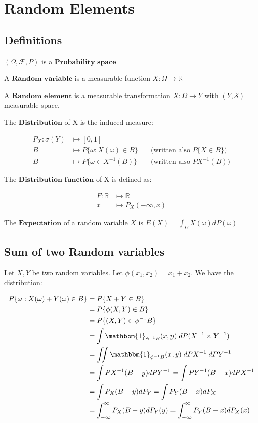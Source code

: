 
\section*{\LARGE Random Elements}

\subsection*{Definitions}

$(\Omega, \mathcal{F}, P)$ is a $\textbf{Probability space}$

\noindent A $\textbf{Random variable}$ is a measurable function $X : \Omega \rightarrow \mathbb{R}$

\noindent A $\textbf{Random element}$ is a measurable transformation $X : \Omega \rightarrow Y$ with $(Y, \mathcal{S})$ measurable space.

\noindent The $\textbf{Distribution}$ of X is the induced measure:

\begin{align*}
P_X : \sigma(Y) &\longmapsto [0,1] \\
    B &\longmapsto P\{\omega: X(\omega) \in B\} \quad &\text{(written also $P\{X \in B\}$)} \\
B &\longmapsto P\{\omega \in X^{-1}(B)\} &\text{(written also $PX^{-1}(B)$)}
\end{align*}

\noindent The $\textbf{Distribution function}$ of X is defined as: 

\begin{align*}
    F:\mathbb{R} &\longmapsto \mathbb{R} \\
x &\longmapsto P_X(-\infty, x)
\end{align*}

\noindent The $\textbf{Expectation}$ of a random variable $X$ is $E(X) = \displaystyle\int_{\Omega} X(\omega)dP(\omega)$


\subsection*{Sum of two Random variables}
Let $X,Y$ be two random variables. Let $\phi(x_1,x_2) = x_1 + x_2$. We have the distribution:

\begin{align*}
P\{\omega: X(\omega)+Y(\omega) \in B\} &= P\{X+Y \in B\} \\
&= P\{\phi(X,Y) \in B\} \\
&= P\{(X,Y) \in \phi^{-1}B\} \\
&= \int \mathbbm{1}_{\phi^{-1}B}(x,y)\;dP(X^{-1}\times Y^{-1}) \\
&= \iint \mathbbm{1}_{\phi^{-1}B}(x,y)\;dPX^{-1}\; dPY^{-1} \\
&= \int PX^{-1}(B-y) dPY^{-1} = \int PY^{-1}(B-x) dPX^{-1} \\
&= \int P_X(B-y) dP_Y = \int P_Y(B-x) dP_X \\
&= \int_{-\infty}^{\infty} P_X(B-y) dP_Y(y) = \int_{-\infty}^{\infty} P_Y(B-x) dP_X(x) \\
\end{align*}

